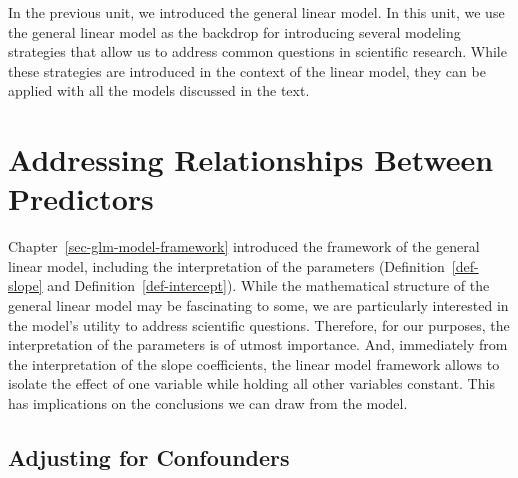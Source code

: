 \documentclass[
  letterpaper,
  DIV=11,
  numbers=noendperiod]{scrreprt}
\theoremstyle{definition}
\theoremstyle{definition}
\theoremstyle{remark}
\begin{document}
In the previous unit, we introduced the general linear model. In this
unit, we use the general linear model as the backdrop for introducing
several modeling strategies that allow us to address common questions in
scientific research. While these strategies are introduced in the
context of the linear model, they can be applied with all the models
discussed in the text.

\hypertarget{sec-modeling-related-predictors}{%
\chapter{Addressing Relationships Between
Predictors}\label{sec-modeling-related-predictors}}

\providecommand{\norm}[1]{\lVert#1\rVert}
\providecommand{\abs}[1]{\lvert#1\rvert}
\providecommand{\dist}[1]{\stackrel{\text{#1}}{\sim}}
\providecommand{\ind}[1]{\mathbb{I}\left(#1\right)}
\providecommand{\bm}[1]{\mathbf{#1}}
\providecommand{\bs}[1]{\boldsymbol{#1}}
\providecommand{\Ell}{\mathcal{L}}
\providecommand{\indep}{\perp\negthickspace\negmedspace\perp}

Chapter~\ref{sec-glm-model-framework} introduced the framework of the
general linear model, including the interpretation of the parameters
(Definition~\ref{def-slope} and Definition~\ref{def-intercept}). While
the mathematical structure of the general linear model may be
fascinating to some, we are particularly interested in the model's
utility to address scientific questions. Therefore, for our purposes,
the interpretation of the parameters is of utmost importance. And,
immediately from the interpretation of the slope coefficients, the
linear model framework allows to isolate the effect of one variable
while holding all other variables constant. This has implications on the
conclusions we can draw from the model.

\hypertarget{adjusting-for-confounders}{%
\section{Adjusting for Confounders}\label{adjusting-for-confounders}}
\end{document}
